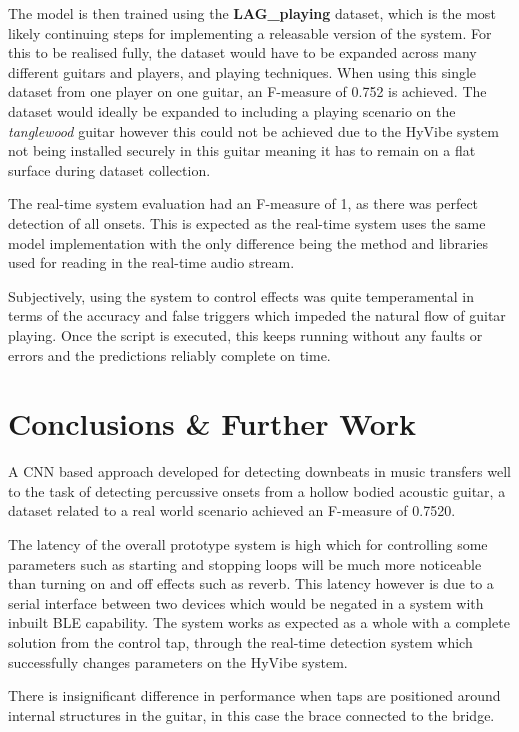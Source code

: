 \documentclass[conference]{IEEEtran}
\begin{document}
The model is then trained using the \textbf{LAG\_playing} dataset, which is the most likely continuing steps for implementing a releasable version of the system. For this to be realised fully, the dataset would have to be expanded across many different guitars and players, and playing techniques. When using this single dataset
from one player on one guitar, an F-measure of 0.752 is achieved. The dataset would ideally be expanded to including a playing scenario on the \emph{tanglewood} guitar however this could not be achieved due to the HyVibe system not being installed securely in this guitar meaning it has to remain on a flat
surface during dataset collection.

The real-time system evaluation had an F-measure of 1, as there was perfect detection of all onsets. This is expected as the real-time system uses the same model implementation with the only difference being the method and libraries used
for reading in the real-time audio stream. 

Subjectively, using the system to control effects was quite temperamental in terms of the accuracy and false triggers which impeded the natural flow of guitar playing. Once the script is executed, this keeps running without any faults or errors and the predictions reliably complete on time.

\section{Conclusions \& Further Work}

A CNN based approach developed for detecting downbeats in music transfers well to the task of detecting percussive onsets from a hollow bodied acoustic guitar, a dataset related to a real world scenario achieved an F-measure of 0.7520.

The latency of the overall prototype system is high which for controlling some parameters such as starting and stopping loops will be much more noticeable than turning on and off effects such as reverb. This latency however is due to a serial interface between two devices which would be 
negated in a system with inbuilt BLE capability. The system works as expected as a whole with a complete solution from the control tap, through the real-time detection system which successfully changes parameters on the HyVibe system.

There is insignificant difference in performance when taps are positioned around internal structures in the guitar, in this case the brace connected to the bridge.
\end{document}
